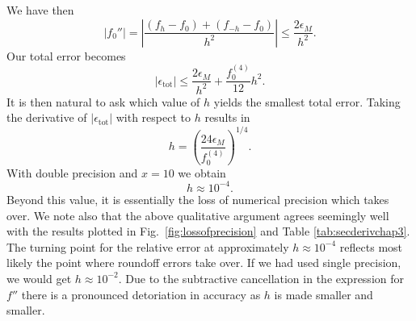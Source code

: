 We have then
\[
 \left|f_0''\right|=
 \left|\frac{ (f_h -f_0) +(f_{-h}-f_0)}{h^2}\right|\le \frac{ 2 \epsilon_M}{h^2}.
\]
Our total error becomes 
\begin{equation}
   \left|\epsilon_{\mathrm{tot}}\right|\le  \frac{2 \epsilon_M}{h^2} + 
                          \frac{f_0^{(4)}}{12}h^{2}. 
    \label{eq:experror}
\end{equation}
It is then natural to ask which value of $h$ yields the smallest
total error. Taking the derivative of $\left|\epsilon_{\mathrm{tot}}\right|$
with respect to $h$ results in
\[
   h= \left(\frac{ 24\epsilon_M}{f_0^{(4)}}\right)^{1/4}.
\]
With double precision and $x=10$ we obtain 
\[
   h\approx 10^{-4}.
\] 
Beyond this value, it is essentially the loss of numerical precision
which takes over. 
We note also that the above qualitative argument agrees seemingly well 
with the results plotted in Fig.\ \ref{fig:lossofprecision} and Table
\ref{tab:secderivchap3}. The turning point for the relative error at
approximately  $h\approx  10^{-4}$ reflects most likely the point
where roundoff errors take over. If we had used single precision, we would get
$h\approx 10^{-2}$. Due to the subtractive cancellation in the expression
for $f''$ there is a pronounced detoriation in accuracy as $h$ is made smaller
and smaller. 

